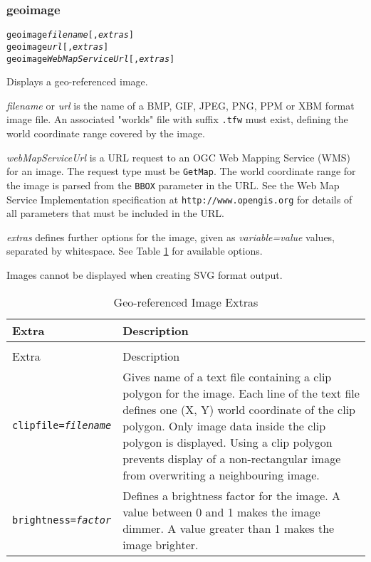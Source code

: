 \subsubsection{geoimage}

\begin{alltt}
geoimage \textit{filename} [, \textit{extras} ]
geoimage \textit{url} [, \textit{extras} ]
geoimage \textit{WebMapServiceUrl} [, \textit{extras} ]
\end{alltt}

Displays a geo-referenced image.

\textit{filename} or
\textit{url}
is the name of a BMP, GIF, JPEG, PNG, PPM or XBM format image file.
An associated "worlds" file with suffix \texttt{.tfw} must exist,
defining the world coordinate range covered by the image.

\textit{webMapServiceUrl} is a URL request to an
OGC Web Mapping Service (WMS)
for an image.  The request type must be \texttt{GetMap}.
The world coordinate range for the image is parsed from the
\texttt{BBOX} parameter in the URL.
See the Web Map Service Implementation specification at
\texttt{http://www.opengis.org}
for details of all parameters that must be included in the URL.

\textit{extras} defines further options for the image, given as
\textit{variable=value} values, separated by whitespace.
See Table \ref{geoimageextras}
for available options.

Images cannot be displayed when creating SVG format output.

\begin{longtable}{|l|p{7cm}|}
\hline
\label{geoimageextras}
Extra & Description \\
\hline
\hline
\endfirsthead
\hline
\caption{Geo-referenced Image Extras} \\
\endfoot

\hline
Extra & Description \\
\hline
\hline
\endhead

\texttt{clipfile=\textit{filename}} &

Gives name of a text file containing a clip polygon for the image.
Each line of the text file defines one (X, Y) world coordinate
of the clip polygon.
Only image data inside the clip polygon is displayed.
Using a clip polygon prevents display of a non-rectangular image
from overwriting a neighbouring image. \\

\texttt{brightness=\textit{factor}} &

Defines a brightness factor for the image.
A value between 0 and 1 makes the image dimmer.
A value greater than 1 makes the image brighter. \\

\hline
\end{longtable}


